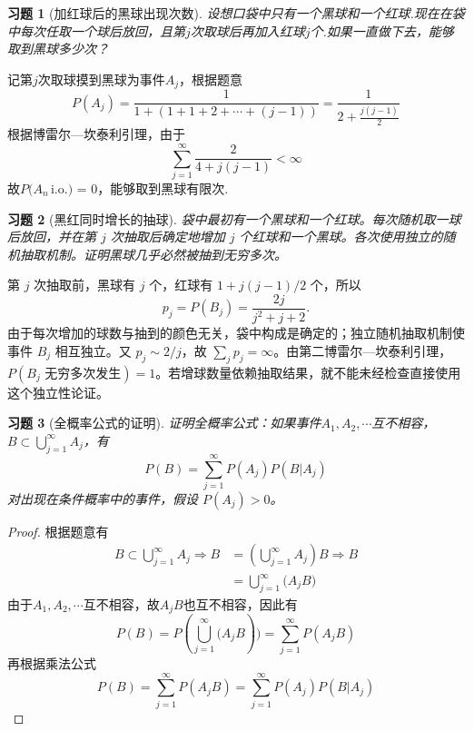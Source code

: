 \documentclass[UTF8,12pt,a4paper,fontset=fandol]{ctexart}
\newtheorem{exercise}{习题}[section]
\begin{document}
\begin{exercise}[加红球后的黑球出现次数]\label{q:Y2.28}
设想口袋中只有一个黑球和一个红球.现在在袋中每次任取一个球后放回，且第$j$次取球后再加入红球$j$个.如果一直做下去，能够取到黑球多少次？\par{}
\end{exercise}

\begin{solve}\label{a:Y2.28}
记第$j$次取球摸到黑球为事件$A_j$，根据题意
\[P({A_j}) = \frac{1}{{1 + (1 + 1 + 2 +  \cdots  + (j - 1))}} = \frac{1}{{2 + \frac{{j(j - 1)}}{2}}}\]
根据博雷尔—坎泰利引理，由于
\[\sum\limits_{j = 1}^\infty  {\frac{2}{{4 + j(j - 1)}}}  < \infty \]
故$P({A_n}\,{\text{i}}.{\text{o}}{\text{.) = 0}}$，能够取到黑球有限次.
\end{solve}

\begin{exercise}[黑红同时增长的抽球]\label{q:Y2.29}
袋中最初有一个黑球和一个红球。每次随机取一球后放回，并在第 $j$ 次抽取后确定地增加 $j$ 个红球和一个黑球。各次使用独立的随机抽取机制。证明黑球几乎必然被抽到无穷多次。\par{}
\end{exercise}

\begin{solve}\label{a:Y2.29}第 $j$ 次抽取前，黑球有 $j$ 个，红球有 $1+j(j-1)/2$ 个，所以\[p_j=P(B_j)=\frac{2j}{j^2+j+2}.\]由于每次增加的球数与抽到的颜色无关，袋中构成是确定的；独立随机抽取机制使事件 $B_j$ 相互独立。又 $p_j\sim2/j$，故 $\sum_jp_j=\infty$。由第二博雷尔—坎泰利引理，$P(B_j\text{ 无穷多次发生})=1$。若增球数量依赖抽取结果，就不能未经检查直接使用这个独立性论证。\end{solve}

\begin{exercise}[全概率公式的证明]\label{q:Y2.30}
证明全概率公式：如果事件$A_1,A_2,\cdots$互不相容，$B\subset \bigcup\limits_{j = 1}^\infty  {{A_j}} $，有
\[P(B) = \sum\limits_{j = 1}^\infty  {P({A_j})P(B|{A_j})} \] 对出现在条件概率中的事件，假设 $P(A_j)>0$。\par{}
\end{exercise}

\begin{proof}\label{a:Y2.30}
根据题意有
\[\begin{aligned}B \subset \bigcup\limits_{j = 1}^\infty  {{A_j}}  \Rightarrow B &= (\bigcup\limits_{j = 1}^\infty  {{A_j}} )B \Rightarrow B \\&= \bigcup\limits_{j = 1}^\infty  {({A_j}} B)\end{aligned}\]
由于$A_1,A_2,\cdots$互不相容，故$A_jB$也互不相容，因此有
\[P(B) = P(\bigcup\limits_{j = 1}^\infty  {({A_j}} B)) = \sum\limits_{j = 1}^\infty  {P({A_j}B)} \]
再根据乘法公式
\[P(B) = \sum\limits_{j = 1}^\infty  {P({A_j}B)}  = \sum\limits_{j = 1}^\infty  {P({A_j})P(B|{A_j})} \]
\end{proof}
\end{document}
